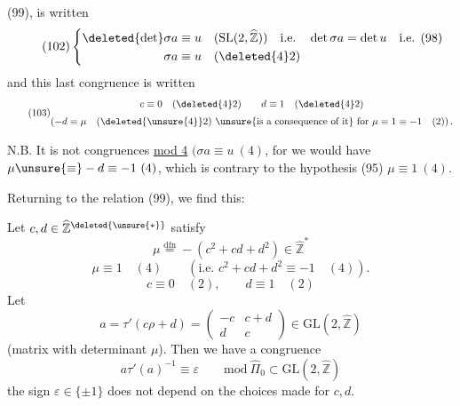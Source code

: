 
  (99),
 is written
\[
\tag{102}
\left\{\begin{aligned}
\deleted{\det}\sigma a&\equiv u\quad
(\mathrm{SL}(2,\widehat{\mathbb Z}))\quad\text{i.e.}\quad
\det\sigma a=\det u\quad\text{i.e. (98)}\\
\sigma a&\equiv u\quad(\deleted{4}2)
\end{aligned}\right.
\]
 and this last congruence is written
\[
\tag{103}\begin{gathered}
c\equiv0\quad(\deleted{4}2)\qquad d\equiv1\quad(\deleted{4}2)
\\[3pt]
\left(-d\equiv\mu\quad(\deleted{\unsure{4}}2)\ \text{\unsure{is a consequence of it}}
\ \text{for }\mu\equiv1\equiv-1\quad(2)\right).
\end{gathered}\]

N.B. It is not  
congruences \uline{mod 4}
$(\sigma a\equiv u\ (4)$, for we would have
$\mu\unsure{\equiv}-d\equiv-1\ (4)$, which is contrary to the hypothesis
(95) $\mu\equiv1\ (4)$.


Returning to the relation (99), we find this:

  Let
$c,d\in\widehat{\mathbb Z}^{\deleted{\unsure{*}}}$ satisfy
\[
\tag{104}
\mu\overset{\mathrm{dfn}}{=}-(c^2+cd+d^2)\in\widehat{\mathbb Z}^{*}
\]
\[
\tag{105}
\mu\equiv1\quad(4)\qquad
(\text{i.e. }c^2+cd+d^2\equiv-1\quad(4)).
\]
\[
\tag{106}
c\equiv0\quad(2),\qquad d\equiv1\quad(2)
\]
Let  
\[
\tag{107}
a=\tau'(c\rho+d)=
\begin{pmatrix}-c&c+d\\d&c\end{pmatrix}
\in\mathrm{GL}(2,\widehat{\mathbb Z})
\]
(matrix with determinant $\mu$). Then we have a congruence
\[
\tag{108}
a\tau'(a)^{-1}\equiv\varepsilon\qquad
\mathrm{mod}\ \widehat{\Pi}_0\subset\mathrm{GL}(2,\widehat{\mathbb Z})
\]
 the sign $\varepsilon\in\{\pm1\}$ does not depend on the
choices made for $c,d$.

